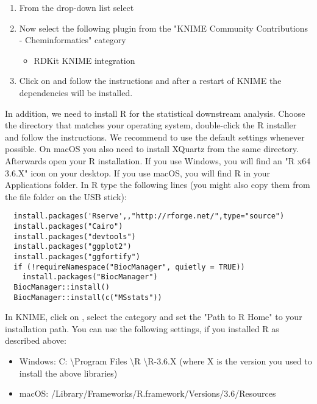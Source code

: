 \begin{enumerate}
\item From the  drop-down list select \\\menu{\KnimeTrustedSite}
\item Now select the following plugin from the "KNIME Community Contributions - Cheminformatics" category 	
    \begin{itemize}
    \item     RDKit KNIME integration
    \end{itemize}	
\item Click on  and follow the instructions and after a restart of KNIME the dependencies will be installed.
\end{enumerate}


\noindent In addition, we need to install R for the statistical downstream analysis. Choose the directory that matches your operating system, double-click the R installer and follow the instructions. We recommend to use the default settings whenever possible. On macOS you also need to install XQuartz from the same directory.\\

\noindent Afterwards open your R installation. If you use Windows, you will find an "R x64 3.6.X" icon on your desktop. If you use macOS, you will find R in your Applications folder. In R type the following lines (you might also copy them from the file  folder on the USB stick):
\begin{listing}
\begin{verbatim}
  install.packages('Rserve',,"http://rforge.net/",type="source")
  install.packages("Cairo")
  install.packages("devtools")
  install.packages("ggplot2")
  install.packages("ggfortify")
  if (!requireNamespace("BiocManager", quietly = TRUE))
	install.packages("BiocManager")
  BiocManager::install()
  BiocManager::install(c("MSstats"))
\end{verbatim}
\end{listing}

\noindent In KNIME, click on , select the category  and set the "Path to R Home" to your installation path. You can use the following settings, if you installed R as described above:
\begin{itemize}
\item Windows: C: \textbackslash Program Files \textbackslash R \textbackslash R-3.6.X (where X is the version you used to install the above libraries)
\item macOS: /Library/Frameworks/R.framework/Versions/3.6/Resources 
\end{itemize}


